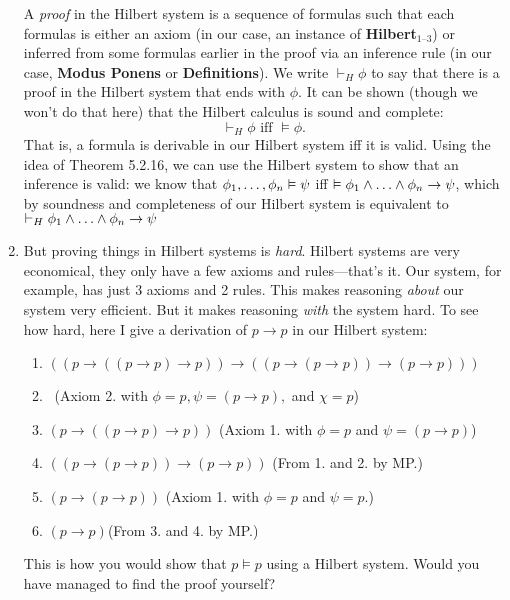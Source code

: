 \begin{enumerate}[\thesection.1]
\begin{description}
		\end{description}
	A \emph{proof} in the Hilbert system is a sequence of formulas such that each formulas is either an axiom (in our case, an instance of \textbf{Hilbert}$_\text{1--3}$) or inferred from some formulas earlier in the proof via an inference rule (in our case, \textbf{Modus Ponens}  or \textbf{Definitions}). We write $\vdash_H\phi$ to say that there is a proof in the Hilbert system that ends with $\phi$. It can be shown (though we won't do that here) that the Hilbert calculus is sound and complete:
	 \[\vdash_H\phi\text{ iff }\vDash\phi.\]
	 That is, a formula is derivable in our Hilbert system iff it is valid. Using the idea of Theorem 5.2.16, we can use the Hilbert system to show that an inference is valid: we know that $\phi_1, \mathellipsis,\phi_n\vDash \psi$ iff $\vDash \phi_1\land \mathellipsis\land \phi_n\to\psi$, which by soundness and completeness of our Hilbert system is equivalent to $\vdash_H \phi_1\land \mathellipsis\land \phi_n\to\psi$
	 
  \item But proving things in Hilbert systems is \emph{hard}.
		Hilbert systems are very economical, they only have a few axioms and rules---that's it.
		Our system, for example, has just 3 axioms and 2 rules.
		This makes reasoning \emph{about} our system very efficient.
		But it makes reasoning \emph{with} the system hard.
		To see how hard, here I give a derivation of $p\to p$ in our Hilbert system:
		\begin{enumerate}[1.]

		  \item $((p \to ((p \to p) \to p)) \to ((p \to (p \to p)) \to (p \to p)))$

		  \item[] \ \hfill (Axiom 2. with $\phi=p, \psi=(p\to p),$ and $\chi=p$)

		  \item $(p \to ((p \to p) \to p))$ \hfill (Axiom 1. with $\phi=p$ and $\psi=(p\to p)$)

		  \item $((p \to (p \to p)) \to (p \to p))$ \hfill (From 1. and 2. by MP.)

		  \item $(p \to (p \to p))$ \hfill (Axiom 1. with $\phi=p$ and $\psi=p$.)

		  \item $(p \to p)$\hfill (From 3. and 4. by MP.)

		\end{enumerate}
		This is how you would show that $p\vDash p$ using a Hilbert system. Would you have managed to find the proof yourself?


\end{enumerate}
